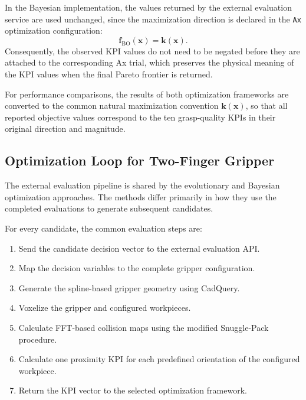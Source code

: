 In the Bayesian implementation, the values returned by the external evaluation service are used
unchanged, since the maximization direction is declared in the \texttt{Ax} optimization
configuration:
\begin{equation}
    \mathbf{f}_{\mathrm{BO}}(\mathbf{x})
    =
    \mathbf{k}(\mathbf{x}).
\end{equation}
Consequently, the observed KPI values do not need to be negated before they are attached to the
corresponding Ax trial, which preserves the physical meaning of the KPI values when the final
Pareto frontier is returned.


For performance comparisons, the results of both optimization frameworks are converted to the common
natural maximization convention $\mathbf{k}(\mathbf{x})$, so that all reported objective values
correspond to the ten grasp-quality KPIs in their original direction and magnitude.

\subsection{Optimization Loop for Two-Finger Gripper}
\label{sec:two_finger_optimization_loop}

The external evaluation pipeline is shared by the evolutionary and Bayesian optimization approaches.
The methods differ primarily in how they use the completed evaluations to generate subsequent
candidates.

For every candidate, the common evaluation steps are:
\begin{enumerate}
    \item Send the candidate decision vector to the external evaluation API.
    \item Map the decision variables to the complete gripper configuration.
    \item Generate the spline-based gripper geometry using CadQuery.
    \item Voxelize the gripper and configured workpieces.
    \item Calculate FFT-based collision maps using the modified Snuggle-Pack procedure.
    \item Calculate one proximity KPI for each predefined orientation of the configured workpiece.
    \item Return the KPI vector to the selected optimization framework.
\end{enumerate}

